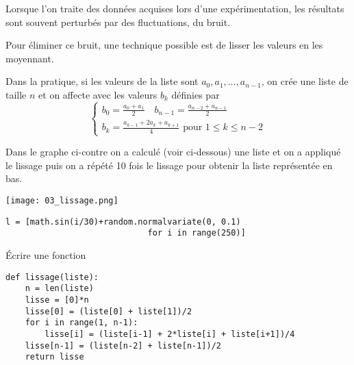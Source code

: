 \begin{Exercise}[title= Lissage d'une liste]
Lorsque l'on traite des données acquises lors d'une expérimentation, les résultats sont souvent perturbés par des fluctuations, du bruit. 

\begin{minipage}[b]{0.55\textwidth}
Pour éliminer ce bruit, une technique possible est de lisser les valeurs en les moyennant.

Dans la pratique, si les valeurs de la liste sont $a_0, a_1, \ldots, a_{n-1}$, on crée une liste de taille $n$ et on affecte avec les valeurs $b_k$ définies par
\[
\left\{\begin{matrix} b_0 = \frac{a_0+a_1}2\quad 
b_{n-1} = \frac{a_{n-2}+a_{n-1}}2\\
 b_k = \frac{a_{k-1}+2a_k+a_{k+1}}4
 \text{ pour }1\le k \le n-2
\end{matrix}
\right.
\]

Dans le graphe ci-contre on a calculé (voir ci-dessous) une liste et on a appliqué le lissage puis on a répété 10 fois le lissage pour obtenir la liste représentée en bas. 
\end{minipage}
\texttt{[image: 03\_lissage.png]} 

\begin{lstlisting}
l = [math.sin(i/30)+random.normalvariate(0, 0.1) 
                             for i in range(250)]
\end{lstlisting}
Écrire une fonction 
\end{Exercise}
\begin{Answer}
\begin{lstlisting}
def lissage(liste):
    n = len(liste)
    lisse = [0]*n
    lisse[0] = (liste[0] + liste[1])/2
    for i in range(1, n-1):
        lisse[i] = (liste[i-1] + 2*liste[i] + liste[i+1])/4
    lisse[n-1] = (liste[n-2] + liste[n-1])/2
    return lisse
\end{lstlisting}
\newpage
\end{Answer}

